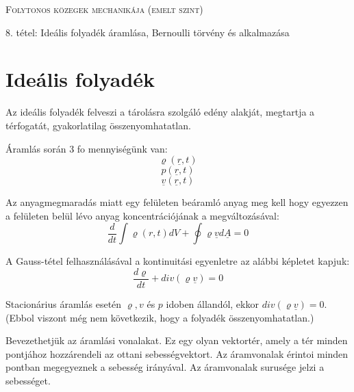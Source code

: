 \documentclass[a4paper,titlepage,12pt]{article}
\begin{document}
	\begin{centering}
		\scshape\LARGE Folytonos közegek mechanikája (emelt szint) \par
		\vspace{1cm}
		
		\large 8. tétel: Ideális folyadék áramlása, Bernoulli törvény és alkalmazása
	\end{centering}

\part*{Ideális folyadék}

Az ideális folyadék felveszi a tárolásra szolgáló edény alakját, megtartja a térfogatát, gyakorlatilag összenyomhatatlan. 

Áramlás során 3 fo mennyiségünk van: 
\begin{equation*}
\varrho(\underline{r},t)
\end{equation*} 
\begin{equation*}
p(\underline{r},t)
\end{equation*} 
\begin{equation*}
\underline{v}(\underline{r},t) 
\end{equation*}

\vspace{0.25 cm}
Az anyagmegmaradás miatt egy felületen beáramló anyag meg kell hogy egyezzen a felületen belül lévo anyag koncentrációjának a megváltozásával: 
\begin{equation*}
 \frac{d}{dt}\int\varrho(r,t)dV+\oint\varrho \underline{v}d\underline{A}=0 
\end{equation*}

A Gauss-tétel felhasználásával a kontinuitási egyenletre az alábbi képletet kapjuk: 
\begin{equation*}
\frac{d\varrho}{dt}+div(\varrho\underline{v})=0 
\end{equation*}

Stacionárius áramlás esetén $\varrho , v$ és $p$ idoben állandól, ekkor $div(\varrho\underline{v})=0$. (Ebbol viszont még nem következik, hogy a folyadék összenyomhatatlan.)

\vspace{0.25 cm}
Bevezethetjük az áramlási vonalakat. Ez egy olyan vektortér, amely a tér minden pontjához hozzárendeli az ottani sebességvektort. Az áramvonalak érintoi minden pontban megegyeznek a sebesség irányával. Az áramvonalak surusége jelzi a sebességet. 
\end{document}
